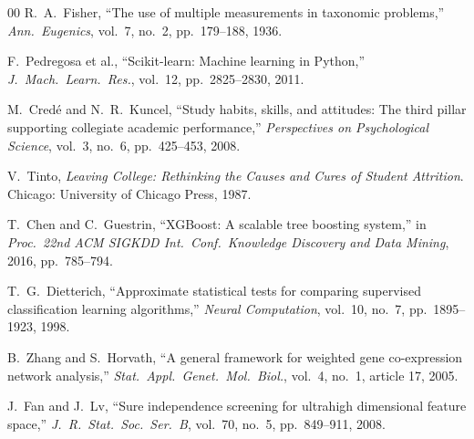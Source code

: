 \documentclass[conference]{IEEEtran}
\begin{document}
\begin{thebibliography}{00}
R.~A.~Fisher,
``The use of multiple measurements in taxonomic problems,''
\textit{Ann.\ Eugenics}, vol.~7, no.~2, pp.~179--188, 1936.

F.~Pedregosa et al.,
``Scikit-learn: Machine learning in Python,''
\textit{J.\ Mach.\ Learn.\ Res.}, vol.~12, pp.~2825--2830, 2011.

M.~Cred\'{e} and N.~R.~Kuncel,
``Study habits, skills, and attitudes: The third pillar supporting
collegiate academic performance,''
\textit{Perspectives on Psychological Science}, vol.~3, no.~6,
pp.~425--453, 2008.

V.~Tinto,
\textit{Leaving College: Rethinking the Causes and Cures of
Student Attrition}.
Chicago: University of Chicago Press, 1987.

T.~Chen and C.~Guestrin,
``XGBoost: A scalable tree boosting system,''
in \textit{Proc.\ 22nd ACM SIGKDD Int.\ Conf.\ Knowledge Discovery and
Data Mining}, 2016, pp.~785--794.

T.~G.~Dietterich,
``Approximate statistical tests for comparing supervised classification
learning algorithms,''
\textit{Neural Computation}, vol.~10, no.~7, pp.~1895--1923, 1998.

B.~Zhang and S.~Horvath,
``A general framework for weighted gene co-expression network analysis,''
\textit{Stat.\ Appl.\ Genet.\ Mol.\ Biol.}, vol.~4, no.~1,
article 17, 2005.

J.~Fan and J.~Lv,
``Sure independence screening for ultrahigh dimensional feature space,''
\textit{J.\ R.\ Stat.\ Soc.\ Ser.\ B}, vol.~70, no.~5,
pp.~849--911, 2008.

\end{thebibliography}
\end{document}
